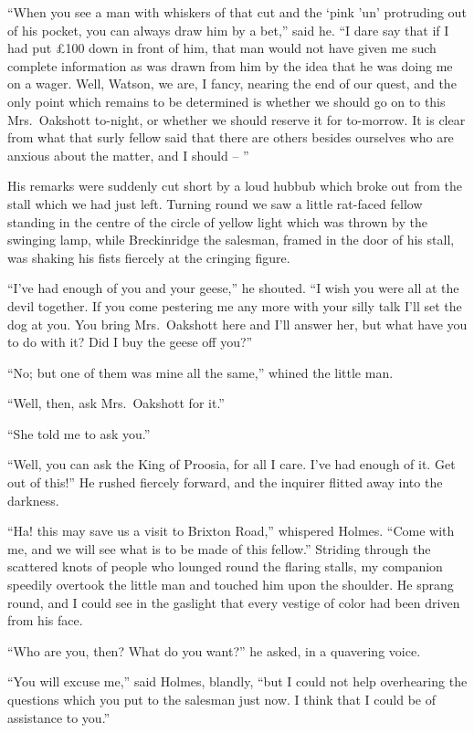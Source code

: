 “When you see a man with whiskers of that cut and the
‘pink ’un’ protruding out of his pocket, you can always
draw him by a bet,” said he. “I dare say that if I had put
£100 down in front of him, that man would not have given
me such complete information as was drawn from him by
the idea that he was doing me on a wager. Well, Watson,
we are, I fancy, nearing the end of our quest, and the only
point which remains to be determined is whether we should
go on to this Mrs.~Oakshott to-night, or whether we should reserve
it for to-morrow. It is clear from what that surly fellow
said that there are others besides ourselves who are anxious
about the matter, and I should -- ”

His remarks were suddenly cut short by a loud hubbub
which broke out from the stall which we had just left. Turning
round we saw a little rat-faced fellow standing in the centre
of the circle of yellow light which was thrown by the
swinging lamp, while Breckinridge the salesman, framed in
the door of his stall, was shaking his fists fiercely at the
cringing figure.

“I’ve had enough of you and your geese,” he shouted. “I
wish you were all at the devil together. If you come pestering
me any more with your silly talk I’ll set the dog at you.
You bring Mrs.~Oakshott here and I’ll answer her, but what
have you to do with it? Did I buy the geese off you?”

“No; but one of them was mine all the same,” whined the
little man.

“Well, then, ask Mrs.~Oakshott for it.”

“She told me to ask you.”

“Well, you can ask the King of Proosia, for all I care.
I’ve had enough of it. Get out of this!” He rushed fiercely
forward, and the inquirer flitted away into the darkness.

“Ha! this may save us a visit to Brixton Road,” whispered
Holmes. “Come with me, and we will see what is to be
made of this fellow.” Striding through the scattered knots
of people who lounged round the flaring stalls, my companion
speedily overtook the little man and touched him upon the
shoulder. He sprang round, and I could see in the gaslight
that every vestige of color had been driven from his
face.

“Who are you, then? What do you want?” he asked, in a
quavering voice.

“You will excuse me,” said Holmes, blandly, “but I could
not help overhearing the questions which you put to the salesman
just now. I think that I could be of assistance to you.”

